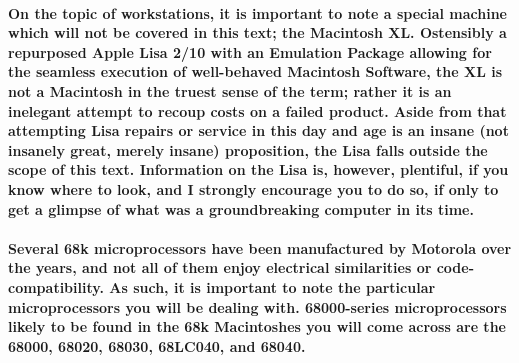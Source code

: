 \paragraph{%
On the topic of workstations, it is important to note a special machine which %
will not be covered in this text; the Macintosh XL. Ostensibly a repurposed %
Apple Lisa 2/10 with an Emulation Package allowing for the seamless execution %
of well-behaved Macintosh Software, the XL is not a Macintosh in the truest %
sense of the term; rather it is an inelegant attempt to recoup costs on a %
failed product. Aside from that attempting Lisa repairs or service in this %
day and age is an insane (not insanely great, merely insane) proposition, the %
Lisa falls outside the scope of this text. Information on the Lisa is, however, %
plentiful, if you know where to look, and I strongly encourage you to do so, if %
only to get a glimpse of what was a groundbreaking computer in its time. %
}

\paragraph{%
Several 68k microprocessors have been manufactured by Motorola over the years, %
and not all of them enjoy electrical similarities or code-compatibility. As such, %
it is important to note the particular microprocessors you will be dealing with. %
68000-series microprocessors likely to be found in the 68k Macintoshes you will %
come across are the 68000, 68020, 68030, 68LC040, and 68040. %
}




